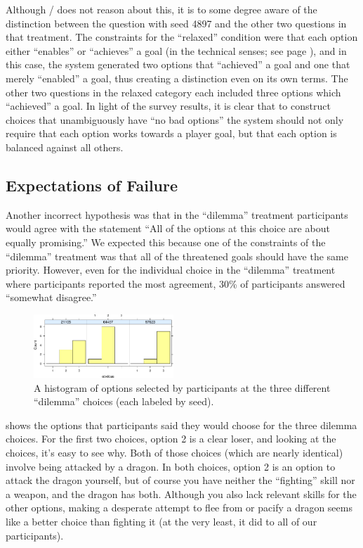 Although \dunyazad/ does not reason about this, it is to some degree aware of the distinction between the question with seed 4897 and the other two questions in that treatment.
%
The constraints for the ``relaxed'' condition were that each option either ``enables'' or ``achieves'' a goal (in the technical senses; see page \pageref{page:choicetypes}), and in this case, the system generated two options that ``achieved'' a goal and one that merely ``enabled'' a goal, thus creating a distinction even on its own terms.
%
The other two questions in the relaxed category each included three options which ``achieved'' a goal.
%
In light of the survey results, it is clear that to construct choices that unambiguously have ``no bad options'' the system should not only require that each option works towards a player goal, but that each option is balanced against all others.


\subsection{Expectations of Failure}

Another incorrect hypothesis was that in the ``dilemma'' treatment participants would agree with the statement ``All of the options at this choice are about equally promising.''
%
We expected this because one of the constraints of the ``dilemma'' treatment was that all of the threatened goals should have the same priority.
%
However, even for the individual choice in the ``dilemma'' treatment where participants reported the most agreement, 30\% of participants answered ``somewhat disagree.'' 


\begin{figure}[h]
  \includegraphics[width=0.47\textwidth,page=3]{fig/choices-cropped.pdf}
  \caption{A histogram of options selected by participants at the three different ``dilemma'' choices (each labeled by seed).}
  \label{fig:dilchoices}
\end{figure}


 shows the options that participants said they would choose for the three dilemma choices.
%
For the first two choices, option 2 is a clear loser, and looking at the choices, it's easy to see why.
%
Both of those choices (which are nearly identical) involve being attacked by a dragon.
%
In both choices, option 2 is an option to attack the dragon yourself, but of course you have neither the ``fighting'' skill nor a weapon, and the dragon has both.
%
Although you also lack relevant skills for the other options, making a desperate attempt to flee from or pacify a dragon seems like a better choice than fighting it (at the very least, it did to all of our participants).


